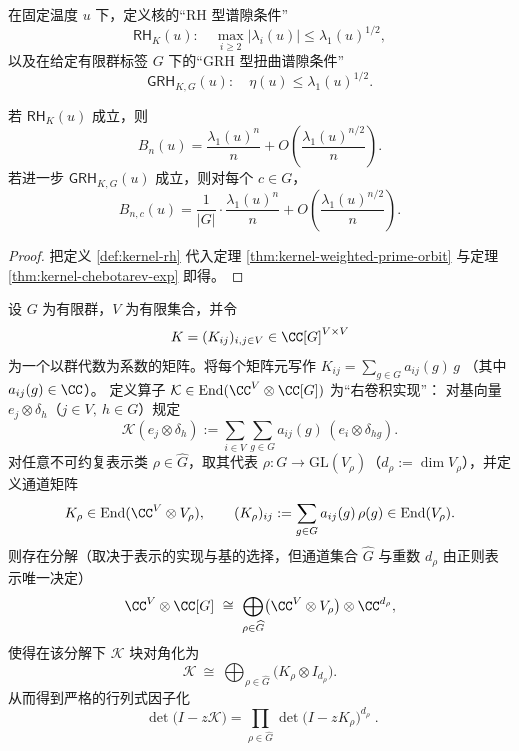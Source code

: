 \begin{definition}\label{def:kernel-rh}
在固定温度 $u$ 下，定义核的“RH 型谱隙条件”
\[
\textsf{RH}_K(u):\quad \max_{i\ge 2}|\lambda_i(u)|\le \lambda_1(u)^{1/2},
\]
以及在给定有限群标签 $G$ 下的“GRH 型扭曲谱隙条件”
\[
\textsf{GRH}_{K,G}(u):\quad \eta(u)\le \lambda_1(u)^{1/2}.
\]
\end{definition}

\begin{corollary}\label{cor:kernel-rh-sqrt-error}
若 $\textsf{RH}_K(u)$ 成立，则
\[
B_n(u)=\frac{\lambda_1(u)^n}{n}+O\!\left(\frac{\lambda_1(u)^{n/2}}{n}\right).
\]
若进一步 $\textsf{GRH}_{K,G}(u)$ 成立，则对每个 $c\in G$，
\[
B_{n,c}(u)=\frac{1}{|G|}\cdot\frac{\lambda_1(u)^n}{n}+O\!\left(\frac{\lambda_1(u)^{n/2}}{n}\right).
\]
\end{corollary}

\begin{proof}
把定义 \ref{def:kernel-rh} 代入定理 \ref{thm:kernel-weighted-prime-orbit} 与定理 \ref{thm:kernel-chebotarev-exp} 即得。
\end{proof}

\begin{proposition}\label{prop:kernel-peter-weyl-block-diagonalization}
设 \(G\) 为有限群，\(V\) 为有限集合，并令
\[
K=(K_{ij})_{i,j\in V}\in \CC[G]^{V\times V}
\]
为一个以群代数为系数的矩阵。将每个矩阵元写作
\(
K_{ij}=\sum_{g\in G}a_{ij}(g)\,g
\)
（其中 \(a_{ij}(g)\in\CC\)）。
定义算子 \(\mathcal{K}\in\mathrm{End}(\CC^{V}\otimes\CC[G])\) 为“右卷积实现”：
对基向量 \(e_j\otimes \delta_h\)（\(j\in V,\ h\in G\)）规定
\[
\mathcal{K}(e_j\otimes \delta_h)
:=
\sum_{i\in V}\sum_{g\in G}a_{ij}(g)\,(e_i\otimes\delta_{hg}).
\]
对任意不可约复表示类 \(\rho\in\widehat G\)，取其代表 \(\rho:G\to\mathrm{GL}(V_\rho)\)（\(d_\rho:=\dim V_\rho\)），并定义通道矩阵
\[
K_\rho\in \mathrm{End}(\CC^{V}\otimes V_\rho),
\qquad
(K_\rho)_{ij}:=\sum_{g\in G}a_{ij}(g)\,\rho(g)\in\mathrm{End}(V_\rho).
\]
则存在分解（取决于表示的实现与基的选择，但通道集合 \(\widehat G\) 与重数 \(d_\rho\) 由正则表示唯一决定）
\[
\CC^{V}\otimes\CC[G]
\ \cong\
\bigoplus_{\rho\in\widehat G}\bigl(\CC^{V}\otimes V_\rho\bigr)\otimes \CC^{d_\rho},
\]
使得在该分解下 \(\mathcal{K}\) 块对角化为
\[
\mathcal{K}\ \cong\ \bigoplus_{\rho\in\widehat G}\bigl(K_\rho\otimes I_{d_\rho}\bigr).
\]
从而得到严格的行列式因子化
\[
\boxed{\;
\det\!\bigl(I-z\mathcal{K}\bigr)
=\prod_{\rho\in\widehat G}\det\!\bigl(I-zK_\rho\bigr)^{d_\rho}\; }.
\]
\end{proposition}

